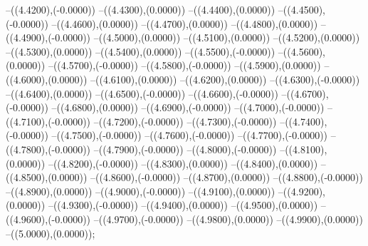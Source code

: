 {	--({\sx*(4.4200)},{\sy*(-0.0000)})
	--({\sx*(4.4300)},{\sy*(0.0000)})
	--({\sx*(4.4400)},{\sy*(0.0000)})
	--({\sx*(4.4500)},{\sy*(-0.0000)})
	--({\sx*(4.4600)},{\sy*(0.0000)})
	--({\sx*(4.4700)},{\sy*(0.0000)})
	--({\sx*(4.4800)},{\sy*(0.0000)})
	--({\sx*(4.4900)},{\sy*(-0.0000)})
	--({\sx*(4.5000)},{\sy*(0.0000)})
	--({\sx*(4.5100)},{\sy*(0.0000)})
	--({\sx*(4.5200)},{\sy*(0.0000)})
	--({\sx*(4.5300)},{\sy*(0.0000)})
	--({\sx*(4.5400)},{\sy*(0.0000)})
	--({\sx*(4.5500)},{\sy*(-0.0000)})
	--({\sx*(4.5600)},{\sy*(0.0000)})
	--({\sx*(4.5700)},{\sy*(-0.0000)})
	--({\sx*(4.5800)},{\sy*(-0.0000)})
	--({\sx*(4.5900)},{\sy*(0.0000)})
	--({\sx*(4.6000)},{\sy*(0.0000)})
	--({\sx*(4.6100)},{\sy*(0.0000)})
	--({\sx*(4.6200)},{\sy*(0.0000)})
	--({\sx*(4.6300)},{\sy*(-0.0000)})
	--({\sx*(4.6400)},{\sy*(0.0000)})
	--({\sx*(4.6500)},{\sy*(-0.0000)})
	--({\sx*(4.6600)},{\sy*(-0.0000)})
	--({\sx*(4.6700)},{\sy*(-0.0000)})
	--({\sx*(4.6800)},{\sy*(0.0000)})
	--({\sx*(4.6900)},{\sy*(-0.0000)})
	--({\sx*(4.7000)},{\sy*(-0.0000)})
	--({\sx*(4.7100)},{\sy*(-0.0000)})
	--({\sx*(4.7200)},{\sy*(-0.0000)})
	--({\sx*(4.7300)},{\sy*(-0.0000)})
	--({\sx*(4.7400)},{\sy*(-0.0000)})
	--({\sx*(4.7500)},{\sy*(-0.0000)})
	--({\sx*(4.7600)},{\sy*(-0.0000)})
	--({\sx*(4.7700)},{\sy*(-0.0000)})
	--({\sx*(4.7800)},{\sy*(-0.0000)})
	--({\sx*(4.7900)},{\sy*(-0.0000)})
	--({\sx*(4.8000)},{\sy*(-0.0000)})
	--({\sx*(4.8100)},{\sy*(0.0000)})
	--({\sx*(4.8200)},{\sy*(-0.0000)})
	--({\sx*(4.8300)},{\sy*(0.0000)})
	--({\sx*(4.8400)},{\sy*(0.0000)})
	--({\sx*(4.8500)},{\sy*(0.0000)})
	--({\sx*(4.8600)},{\sy*(-0.0000)})
	--({\sx*(4.8700)},{\sy*(0.0000)})
	--({\sx*(4.8800)},{\sy*(-0.0000)})
	--({\sx*(4.8900)},{\sy*(0.0000)})
	--({\sx*(4.9000)},{\sy*(-0.0000)})
	--({\sx*(4.9100)},{\sy*(0.0000)})
	--({\sx*(4.9200)},{\sy*(0.0000)})
	--({\sx*(4.9300)},{\sy*(-0.0000)})
	--({\sx*(4.9400)},{\sy*(0.0000)})
	--({\sx*(4.9500)},{\sy*(0.0000)})
	--({\sx*(4.9600)},{\sy*(-0.0000)})
	--({\sx*(4.9700)},{\sy*(-0.0000)})
	--({\sx*(4.9800)},{\sy*(0.0000)})
	--({\sx*(4.9900)},{\sy*(0.0000)})
	--({\sx*(5.0000)},{\sy*(0.0000)});
}
